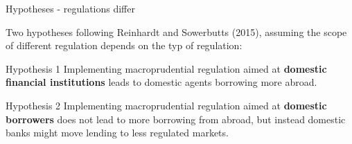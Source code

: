 \documentclass{beamer}
\begin{document}
\begin{frame}{Hypotheses - regulations differ}

Two hypotheses following Reinhardt and Sowerbutts (2015), assuming the scope of different regulation depends on the typ of regulation:

\begin{block}{Hypothesis 1} 
Implementing macroprudential regulation aimed at \textbf{domestic financial institutions} leads to domestic agents borrowing more abroad.
\end{block}

\begin{block}{Hypothesis 2} 
Implementing macroprudential regulation aimed at\textbf{ domestic borrowers} does not lead to more borrowing from abroad, but instead domestic banks might move lending to less regulated markets.
\end{block}
\end{frame}

\end{document}
